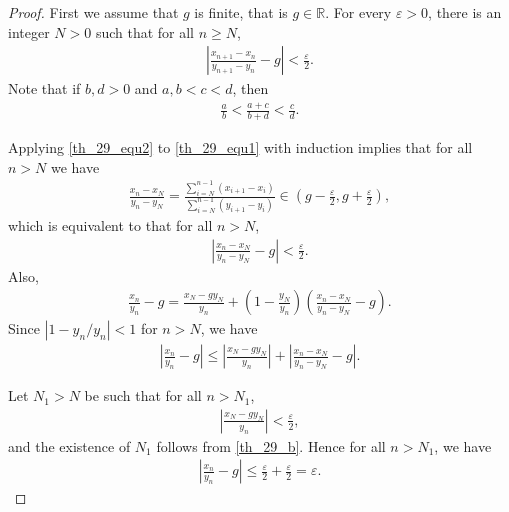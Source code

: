 \documentclass[11pt]{book}
\theoremstyle{definition}
\numberwithin{equation}{chapter}
\begin{document}
\begin{proof}
First we assume that $g$ is finite, that is $g \in \mathbb{R}$. For every $\varepsilon > 0$, there is an integer $N > 0$ such that for all $n \geq N$, 
\begin{align}\label{th_29_equ1}
    \left|\frac{x_{n+1} - x_n}{y_{n+1} - y_n} - g\right| < \frac{\varepsilon}{2}.
\end{align}
Note that if $b,d > 0$ and $a,b < c < d$, then
\begin{align}\label{th_29_equ2}
    \frac{a}{b} < \frac{a+c}{b+d} < \frac{c}{d}.
\end{align}

Applying \eqref{th_29_equ2} to \eqref{th_29_equ1} with induction implies that for all $n > N$ we have
\begin{align*}
    \frac{x_n - x_N}{y_n - y_N} = \frac{\sum^{n-1}_{i=N} (x_{i+1} - x_i)}{\sum^{n-1}_{i=N} (y_{i+1} - y_i)} \in \left(g - \frac{\varepsilon}{2}, g + \frac{\varepsilon}{2}\right),
\end{align*}
which is equivalent to that for all $n > N$,
\begin{align}
    \left|\frac{x_n - x_N}{y_n - y_N} - g\right| < \frac{\varepsilon}{2}.
\end{align}
Also, 
\begin{align*}
    \frac{x_n}{y_n} - g = \frac{x_N - gy_N}{y_n} + \left(1 - \frac{y_N}{y_n}\right) \left(\frac{x_n - x_N}{y_n - y_N} - g\right).
\end{align*}
Since $\left|1 - y_n/y_n\right| < 1$ for $n > N$, we have
\begin{align}
    \left|\frac{x_n}{y_n} - g\right|  \leq \left|\frac{x_N - gy_N}{y_n}\right| + \left|\frac{x_n - x_N}{y_n - y_N} - g\right|.
\end{align}

Let $N_1 > N$ be such that for all $n > N_1$,
\begin{align}
    \left|\frac{x_N - gy_N}{y_n}\right| < \frac{\varepsilon}{2},
\end{align}
and the existence of $N_1$ follows from \ref{th_29_b}. Hence for all $n > N_1$, we have
\begin{align*}
    \left|\frac{x_n}{y_n} - g\right| \leq \frac{\varepsilon}{2} + \frac{\varepsilon}{2} = \varepsilon.
\end{align*}


\end{proof}
\end{document}
